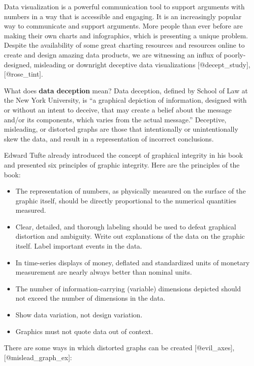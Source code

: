 \documentclass[]{book}
\providecommand{\tightlist}{%
  \setlength{\itemsep}{0pt}\setlength{\parskip}{0pt}}
\theoremstyle{definition}
\theoremstyle{definition}
\theoremstyle{definition}
\theoremstyle{remark}
\begin{document}
Data visualization is a powerful communication tool to support arguments
with numbers in a way that is accessible and engaging. It is an
increasingly popular way to communicate and support arguments. More
people than ever before are making their own charts and infographics,
which is presenting a unique problem. Despite the availability of some
great charting resources and resources online to create and design
amazing data products, we are witnessing an influx of poorly-designed,
misleading or downright deceptive data visualizations
{[}@decept\_study{]},{[}@rose\_tint{]}.

What does \textbf{data deception} mean? Data deception, defined by
School of Law at the New York University, is ``a graphical depiction of
information, designed with or without an intent to deceive, that may
create a belief about the message and/or its components, which varies
from the actual message.'' Deceptive, misleading, or distorted graphs
are those that intentionally or unintentionally skew the data, and
result in a representation of incorrect conclusions.

Edward Tufte already introduced the concept of graphical integrity in
his book and presented six principles of graphic integrity. Here are the
principles of the book:

\begin{itemize}
\tightlist
\item
  The representation of numbers, as physically measured on the surface
  of the graphic itself, should be directly proportional to the
  numerical quantities measured.
\item
  Clear, detailed, and thorough labeling should be used to defeat
  graphical distortion and ambiguity. Write out explanations of the data
  on the graphic itself. Label important events in the data.
\item
  In time-series displays of money, deﬂated and standardized units of
  monetary measurement are nearly always better than nominal units.
\item
  The number of information-carrying (variable) dimensions depicted
  should not exceed the number of dimensions in the data.
\item
  Show data variation, not design variation.
\item
  Graphics must not quote data out of context.
\end{itemize}

There are some ways in which distorted graphs can be created
{[}@evil\_axes{]},{[}@mislead\_graph\_ex{]}:
\end{document}

